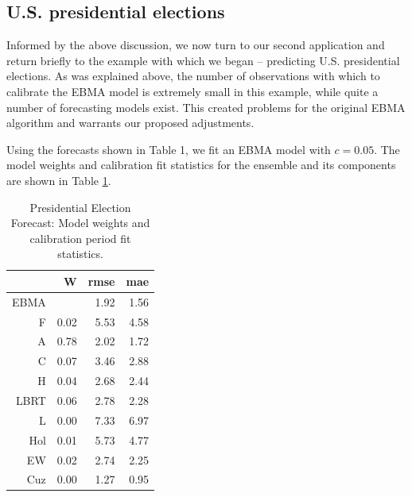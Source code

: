 \documentclass[12pt,fullpage,endnotes]{article}
\begin{document}
\subsection{U.S. presidential elections}

Informed by the above discussion, we now turn to our second application and return briefly to the example
with which we began -- predicting U.S. presidential elections.  As was explained above, the number of observations with which to calibrate the EBMA model is extremely small in this example, while quite a number of forecasting models exist. This created problems for the original EBMA algorithm and warrants our proposed adjustments. 

Using the forecasts shown in Table 1, we fit an EBMA model with $c=0.05$.
The model weights and calibration fit statistics for the ensemble and
its components are shown in Table \ref{presModel}.


\begin{table}[ht]
\caption{Presidential Election Forecast: Model weights and calibration period fit statistics.}
\label{presModel}
\begin{center}
\begin{tabular}{rrrr}
  \toprule
 & W & rmse & mae \\ 
  \midrule
EBMA &  & 1.92 & 1.56 \\ 
  F & 0.02 & 5.53 & 4.58 \\ 
  A & 0.78 & 2.02 & 1.72 \\ 
  C & 0.07 & 3.46 & 2.88 \\ 
  H & 0.04 & 2.68 & 2.44 \\ 
  LBRT & 0.06 & 2.78 & 2.28 \\ 
  L & 0.00 & 7.33 & 6.97 \\ 
  Hol & 0.01 & 5.73 & 4.77 \\ 
  EW & 0.02 & 2.74 & 2.25 \\ 
  Cuz & 0.00 & 1.27 & 0.95 \\ 
   \bottomrule
\end{tabular}
\end{center}
\end{table}
\end{document}
